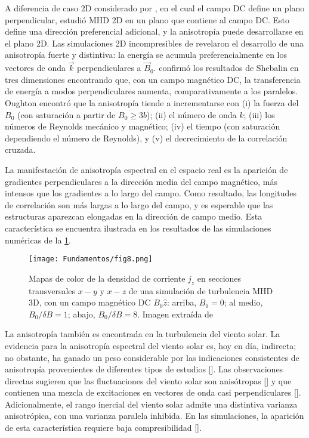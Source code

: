 A diferencia de caso 2D considerado por \cite{fyfe_dissipative_1977},
en el cual el campo DC define un plano perpendicular,
\cite{shebalin_anisotropy_1983} estudió MHD 2D en un plano que
contiene al campo DC. Esto define una dirección preferencial
adicional, y la anisotropía puede desarrollarse en el plano 2D. Las
simulaciones 2D incompresibles de \cite{shebalin_anisotropy_1983}
revelaron el desarrollo de una anisotropía fuerte y distintiva: la
energía se acumula preferencialmente en los vectores de onda $\vec{k}$
perpendiculares a $\vec{B}_0$. \cite{oughton_influence_1994} confirmó
los resultados de Shebalin en tres dimensiones encontrando que, con un
campo magnético DC, la transferencia de energía a modos
perpendiculares aumenta, comparativamente a los paralelos. Oughton
encontró que la anisotropía tiende a incrementarse con (i) la fuerza
del $B_0$ (con saturación a partir de $B_0 \geq 3b$); (ii) el número de
onda $k$; (iii) los números de Reynolds mecánico y magnético; (iv) el tiempo
(con saturación dependiendo el número de Reynolds), y (v)
el decrecimiento de la correlación cruzada.

La manifestación de anisotropía espectral en el espacio real es la
aparición de gradientes perpendiculares a la dirección media del campo
magnético, más intensos que los gradientes a lo largo del campo. Como
resultado, las longitudes de correlación son más largas a lo largo del
campo, y es esperable que las estructuras aparezcan elongadas en la
dirección de campo medio. Esta característica se encuentra ilustrada
en los resultados de las simulaciones numéricas de
la \cref{fig:currentdensity}.

\begin{figure}[h!]
  \centering
  \texttt{[image: Fundamentos/fig8.png]}
  \caption{Mapas de color de la densidad de corriente $j_z$ en
    secciones transversales $x-y$ y $x-z$ de una simulación de
    turbulencia MHD 3D, con un campo magnético DC $B_0 \hat{z}$:
    arriba, $B_0 = 0$; al medio, $B_0/\delta B = 1$; abajo,
    $B_0/\delta B = 8$. Imagen extraída de
    \cite{zhou_colloquium_2004}}
  \label{fig:currentdensity}
\end{figure}


La anisotropía también es encontrada en la turbulencia del viento
solar. La evidencia para la anisotropía espectral del viento solar es,
hoy en día, indirecta; no obstante, ha ganado un peso considerable
por las indicaciones consistentes de anisotropía provenientes de
diferentes tipos de estudios [\cite{matthaeus_unquiet_1995}]. Las
observaciones directas sugieren que las fluctuaciones del viento solar
son anisótropas [\cite{carbone_model_1995}] y que contienen una mezcla
de excitaciones en vectores de onda casi perpendiculares
[\cite{bieber_dominant_1996}]. Adicionalmente, el rango inercial del
viento solar admite una distintiva varianza anisotrópica, con una
varianza paralela inhibida. En las simulaciones, la aparición de esta
característica requiere baja compresibilidad
[\cite{matthaeus_anisotropic_1996}].

